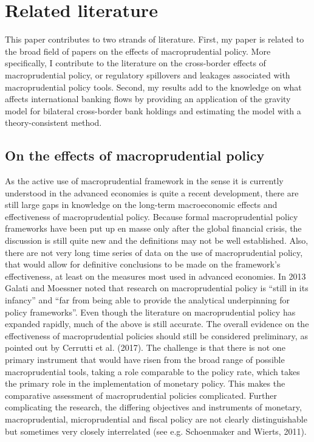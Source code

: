 \documentclass[12pt,a4paper]{article}
\begin{document}
\newpage
\section{Related literature}

This paper contributes to two strands of literature. First, my paper is related to the broad field of papers on the effects of macroprudential policy. More specifically, I contribute to the literature on the cross-border effects of macroprudential policy, or regulatory spillovers and leakages associated with macroprudential policy tools. Second, my results add to the knowledge on what affects international banking flows by providing an application of the gravity model for bilateral cross-border bank holdings and estimating the model with a theory-consistent method.

\subsection{On the effects of macroprudential policy}

As the active use of macroprudential framework in the sense it is currently understood in the advanced economies is quite a recent development, there are still large gaps in knowledge on the long-term macroeconomic effects and effectiveness of macroprudential policy. Because formal macroprudential policy frameworks have been put up en masse only after the global financial crisis, the discussion is still quite new and the definitions may not be well established. Also, there are not very long time series of data on the use of macroprudential policy, that would allow for definitive conclusions to be made on the framework's effectiveness, at least on the measures most used in advanced economies. In 2013 Galati and Moessner noted that research on macroprudential policy is “still in its infancy” and “far from being able to provide the analytical underpinning for policy frameworks”. Even though the literature on macroprudential policy has expanded rapidly, much of the above is still accurate. The overall evidence on the effectiveness of macroprudential policies should still be considered preliminary, as pointed out by Cerrutti et al. (2017). The challenge is that there is not one primary instrument that would have risen from the broad range of possible macroprudential tools, taking a role comparable to the policy rate, which takes the primary role in the implementation of monetary policy. This makes the comparative assessment of macroprudential policies complicated. Further complicating the research, the differing objectives and instruments of monetary, macroprudential, microprudential and fiscal policy are not clearly distinguishable but sometimes very closely interrelated (see e.g. Schoenmaker and Wierts, 2011).
\end{document}
